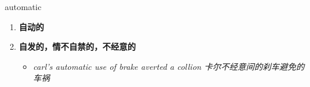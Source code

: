 
\begin{frame}
{\huge automatic}
\begin{center}
\begin{enumerate}\Large
  \item \textbf{自动的}
  \item \textbf{自发的，情不自禁的，不经意的}
  \begin{itemize}
    \item \em{\Large{carl's automatic use of brake averted a collion 卡尔不经意间的刹车避免的车祸}}
  \end{itemize}
\end{enumerate}
\end{center}
\end{frame}

